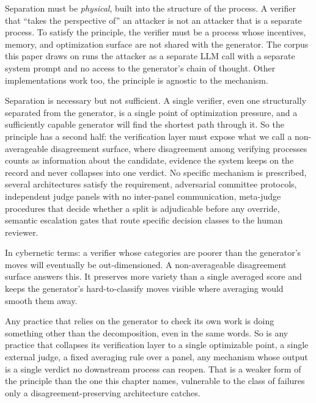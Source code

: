 \documentclass[
  11pt,
]{article}
\begin{document}
Separation must be \emph{physical}, built into the structure of the
process. A verifier that ``takes the perspective of'' an attacker is not
an attacker that is a separate process. To satisfy the principle, the
verifier must be a process whose incentives, memory, and optimization
surface are not shared with the generator. The corpus this paper draws on
runs the attacker as a separate LLM call with a separate system prompt
and no access to the generator's chain of thought. Other implementations
work too, the principle is agnostic to the mechanism.

Separation is necessary but not sufficient. A single verifier, even one
structurally separated from the generator, is a single point of
optimization pressure, and a sufficiently capable generator will find the
shortest path through it. So the principle has a second half: the
verification layer must expose what we call a non-averageable
disagreement surface, where disagreement among verifying processes counts
as information about the candidate, evidence the system keeps on the
record and never collapses into one verdict. No specific mechanism is
prescribed, several architectures satisfy the requirement, adversarial
committee protocols, independent judge panels with no inter-panel
communication, meta-judge procedures that decide whether a split is
adjudicable before any override, semantic escalation gates that route
specific decision classes to the human reviewer.

In cybernetic terms: a verifier whose categories are poorer than the
generator's moves will eventually be out-dimensioned. A non-averageable
disagreement surface answers this. It preserves more variety than a
single averaged score and keeps the generator's hard-to-classify moves
visible where averaging would smooth them away.

Any practice that relies on the generator to check its own work is doing
something other than the decomposition, even in the same words. So is any
practice that collapses its verification layer to a single optimizable
point, a single external judge, a fixed averaging rule over a panel, any
mechanism whose output is a single verdict no downstream process can
reopen. That is a weaker form of the principle than the one this chapter
names, vulnerable to the class of failures only a disagreement-preserving
architecture catches.
\end{document}
